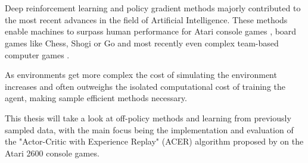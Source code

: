 \section*{}
Deep reinforcement learning and policy gradient methods majorly contributed to the most recent advances in the field of Artificial Intelligence.
These methods enable machines to surpass human performance for Atari console games \citep{mnih2015atari}, board games like Chess, Shogi \citep{Shogi17} or Go \citep{Go2017} and most recently even complex team-based computer games \citep{OpenAI_dota}.

As environments get more complex the cost of simulating the environment increases and often outweighs the isolated computational cost of training the agent, making sample efficient methods necessary.

This thesis will take a look at off-policy methods and learning from previously sampled data, with the main focus being the implementation and evaluation of the "Actor-Critic with Experience Replay" (ACER) algorithm proposed by \citet{ACER} on the Atari 2600 console games.
